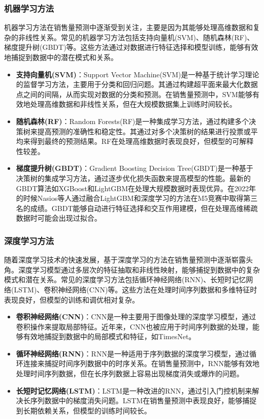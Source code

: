 \documentclass[12pt]{article}
\begin{document}
\subsubsection{机器学习方法}
机器学习方法在销售量预测中逐渐受到关注，主要是因为其能够处理高维数据和复杂的非线性关系。常见的机器学习方法包括支持向量机(SVM)、随机森林(RF)、梯度提升树(GBDT)等。这些方法通过对数据进行特征选择和模型训练，能够有效地捕捉到数据中的潜在模式和关系。
\begin{itemize}
    \item \textbf{支持向量机(SVM)}：Support Vector Machine(SVM)是一种基于统计学习理论的监督学习方法，主要用于分类和回归问题。其通过构建超平面来最大化数据点之间的间隔，从而实现对数据的分类和预测\cite{SVM}。在销售量预测中，SVM能够有效地处理高维数据和非线性关系，但在大规模数据集上训练时间较长。
    \item \textbf{随机森林(RF)}：Random Forests(RF)是一种集成学习方法，通过构建多个决策树来提高预测的准确性和稳定性。其通过对多个决策树的结果进行投票或平均来得到最终的预测结果\cite{Random_Forests}。RF在处理高维数据时表现良好，但模型的可解释性较差。
    \item \textbf{梯度提升树(GBDT)}：Gradient Boosting Decision Tree(GBDT)是一种基于决策树的集成学习方法，通过逐步优化损失函数来提高模型的性能。最新的GBDT算法如XGBoost\cite{XGBoost}和LightGBM\cite{LightGBM}在处理大规模数据时表现优异。在2022年的时候Nasios等人通过融合LightGBM和深度学习的方法在M5竞赛中取得第三名的成绩\cite{M5_3rd}。GBDT能够自动进行特征选择和交互作用建模，但在处理高维稀疏数据时可能会出现过拟合。
\end{itemize}

\subsubsection{深度学习方法}
随着深度学习技术的快速发展，基于深度学习的方法在销售量预测中逐渐崭露头角。深度学习模型通过多层次的特征抽取和非线性映射，能够捕捉到数据中的复杂模式和潜在关系。常见的深度学习方法包括循环神经网络(RNN)、长短时记忆网络(LSTM)、卷积神经网络(CNN)等。这些方法在处理时间序列数据和多维特征时表现良好，但模型的训练和调优相对复杂。
\begin{itemize}
    \item \textbf{卷积神经网络(CNN)}：CNN是一种主要用于图像处理的深度学习模型，通过卷积操作来提取局部特征\cite{CNNTimeseries}。近年来，CNN也被应用于时间序列数据的处理，能够有效地捕捉到数据中的局部模式和特征，如TimesNet\cite{TimesNet}。
    \item \textbf{循环神经网络(RNN)}：RNN是一种适用于序列数据的深度学习模型，通过循环连接来捕捉时间序列数据中的时序关系\cite{RNNTimeseries}。在销售量预测中，RNN能够有效地处理时间序列数据，但在长序列数据上容易出现梯度消失或爆炸的问题。
    \item \textbf{长短时记忆网络(LSTM)}：LSTM是一种改进的RNN，通过引入门控机制来解决长序列数据中的梯度消失问题\cite{Transformer-LSTM}。LSTM在销售量预测中表现良好，能够捕捉到长期依赖关系，但模型的训练时间较长。
\end{itemize}
\end{document}
